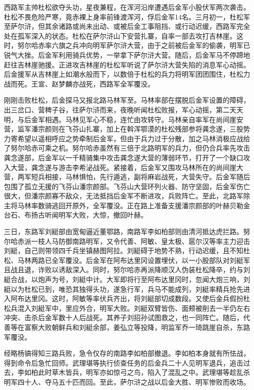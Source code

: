 西路军主帅杜松欲夺头功，星夜兼程，在浑河沿岸遭遇后金军小股伏军两次袭击。杜松不畏危险严寒，竟赤裸上身率前锋渡浑河，俘后金军14名。三月初一，杜松军至萨尔浒，但其余诸路或尚未出动、或被后金工事阻挡、或行动迟缓，西路军完全处在孤军深入的状态。杜松在萨尔浒山下安营扎寨，自率一部去攻打吉林崖。这时，努尔哈赤率六旗之兵冲向明军萨尔浒大营，由于之前被后金军的偷袭，明军已锐气大挫。后金军利用骑兵优势，一举拿下萨尔浒大营。随后，后金军马不停蹄地赶往吉林崖驰援。正进攻吉林崖的杜松军听说了萨尔浒大营失陷的消息军心动摇。后金援军从吉林崖上如潮水般而下，以数倍于杜松的兵力将明军团团围住，杜松力战而死。王宣、赵梦麟亦战死，西路军全军覆没。

刚刚击败杜松，后金探马又报北路马林军至。马林率部在摆脱后金军设置的障碍，出三岔口、营稗子谷，往萨尔浒而来，夜晚听闻杜松败报，军心动摇，第二天天明，与后金军相遇。马林见军心不稳，连忙由攻转守。马林亲自率军在尚间崖安营，监军潘宗颜则在飞芬山扎寨，加上在斡浑鄂漠的杜松残部参将龚念遂，三股势力寄希望以遥相呼应之势牵制后金军，但由于兵力过于分散，加之马林消极应战给了努尔哈赤可乘之机。努尔哈赤虽然有三倍于北路明军的兵力，但仍合兵率先攻击龚念遂部，后金军以一千精骑集中攻击龚念遂大营的薄弱环节，打开了一个缺口攻入大营，龚念遂与游击李希泌战死。紧接着，后金军又围攻马林所在的尚间崖大营，两军短兵相接，马林惧怕，先行遁逃，副将麻岩战死，大营失守。后金军随后包围了孤立无援的飞芬山潘宗颜部。飞芬山大营环列火器、防守坚固，后金军伤亡很大，但潘宗颜寡不敌众，无法抵挡后金军不断进攻，兵败阵亡。至此，北路军除主将马林率数骑逃回开原外，全军覆没。正在路上准备支援潘宗颜部的叶赫贝勒金台石、布扬古听闻明军大败，大惊，撤回叶赫。

三日，东路军刘綎部由宽甸逼近董鄂路，南路军李如柏部则由清河抵达虎拦路。努尔哈赤派一枝人马防御南路明军，又令代善、阿敏、皇太极、扈尔汉等率主力迎击刘綎，自己则带领四千兵坐镇赫图阿拉。刘綎碍于地势不熟，行动迟缓，且不知杜松、马林两路已全军覆没。后金军在阿布达里冈设置埋伏，以一小股部队对刘綎军且战且退，诈败以诱敌深入。同时，努尔哈赤再派降顺汉人伪装杜松降卒，约与刘綎合战，以炮声为号，刘綎中计。大军即将行至阿布达里冈时，忽闻大炮三响，刘綎以为杜松已到，唯恐其独得头功，遂急行军，兵马不能成列，刘綎率精兵抢先进入阿布达里冈。这时，阿敏等率伏兵齐出，将刘綎部切成数段。又使后金兵假扮杜松兵混入刘綎军中，里应外合，明军大败。刘綎双臂皆伤、面颊被削去一半仍左右冲突、击杀后金军数十人后战死。其养子刘招孙试图救之，也一同阵亡。随后，代善等在富察大败朝鲜兵和刘綎余部，姜弘立等投降，明监军乔一琦跳崖自杀，东路军覆没。

经略杨镐得知三路兵败，急令仅存的南路李如柏部撤退。李如柏本身就有所怯战，得到命令后急忙回师。武理堪等执行侦查任务的后金兵二十人见明军退兵，追击过去，李如柏此时草木皆兵，明军亦如惊弓之鸟，陷入了混乱之中。武理堪等趁乱杀明军四十人、夺马五十匹而回。至此，萨尔浒之战以后金大胜、明军惨败而收场。

